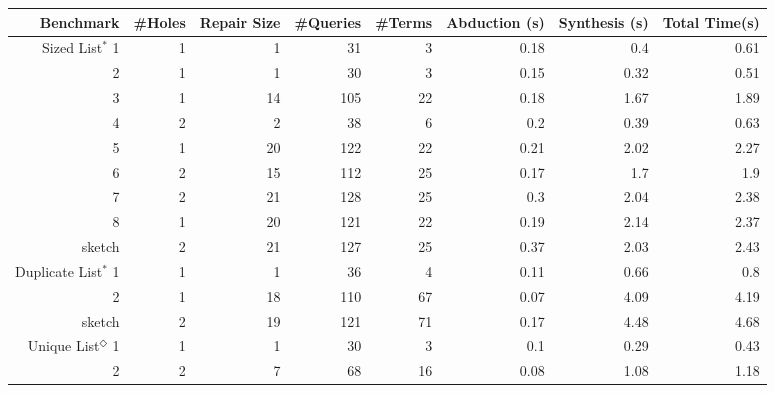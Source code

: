 \begin{tabular}{r|rr|rrrrr}
\hline
                Benchmark &   \#Holes &   Repair Size &   \#Queries &   \#Terms &   Abduction (s) &   Synthesis (s) &   Total Time(s) \\
\hline
         Sized List$^*$ 1 &        1 &             1 &         31 &        3 &            0.18 &            0.4  &            0.61 \\
                        2 &        1 &             1 &         30 &        3 &            0.15 &            0.32 &            0.51 \\
                        3 &        1 &            14 &        105 &       22 &            0.18 &            1.67 &            1.89 \\
                        4 &        2 &             2 &         38 &        6 &            0.2  &            0.39 &            0.63 \\
                        5 &        1 &            20 &        122 &       22 &            0.21 &            2.02 &            2.27 \\
                        6 &        2 &            15 &        112 &       25 &            0.17 &            1.7  &            1.9  \\
                        7 &        2 &            21 &        128 &       25 &            0.3  &            2.04 &            2.38 \\
                        8 &        1 &            20 &        121 &       22 &            0.19 &            2.14 &            2.37 \\
                   sketch &        2 &            21 &        127 &       25 &            0.37 &            2.03 &            2.43 \\
\midrule
     Duplicate List$^*$ 1 &        1 &             1 &         36 &        4 &            0.11 &            0.66 &            0.8  \\
                        2 &        1 &            18 &        110 &       67 &            0.07 &            4.09 &            4.19 \\
                   sketch &        2 &            19 &        121 &       71 &            0.17 &            4.48 &            4.68 \\
\midrule
 Unique List$^\Diamond$ 1 &        1 &             1 &         30 &        3 &            0.1  &            0.29 &            0.43 \\
                        2 &        2 &             7 &         68 &       16 &            0.08 &            1.08 &            1.18 \\

\end{tabular}
